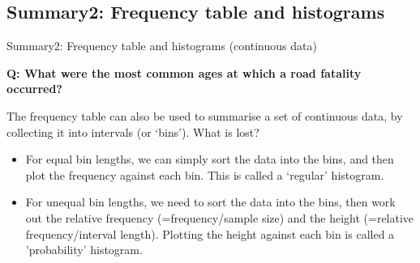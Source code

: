 \documentclass[t,xcolor=pdftex,dvipsnames,table]{beamer}
\makeatletter
\def\maxwidth{ %
  \ifdim\Gin@nat@width>\linewidth
    \linewidth
  \else
    \Gin@nat@width
  \fi
}
\newcommand{\hlcom}[1]{\textcolor[rgb]{0.678,0.584,0.686}{\textit{#1}}}%
\newcommand{\hlopt}[1]{\textcolor[rgb]{0,0,0}{#1}}%
\newcommand{\hlstd}[1]{\textcolor[rgb]{0.345,0.345,0.345}{#1}}%
\newcommand{\hlkwb}[1]{\textcolor[rgb]{0.69,0.353,0.396}{#1}}%
\newcommand{\hlkwd}[1]{\textcolor[rgb]{0.737,0.353,0.396}{\textbf{#1}}}%
\newenvironment{kframe}{%
 \def\at@end@of@kframe{}%
 \ifinner\ifhmode%
  \def\at@end@of@kframe{\end{minipage}}%
  \begin{minipage}{\columnwidth}%
 \fi\fi%
 \def\FrameCommand##1{\hskip\@totalleftmargin \hskip-\fboxsep
 \colorbox{shadecolor}{##1}\hskip-\fboxsep
     \hskip-\linewidth \hskip-\@totalleftmargin \hskip\columnwidth}%
 \MakeFramed {\advance\hsize-\width
   \@totalleftmargin\z@ \linewidth\hsize
   \@setminipage}}%
 {\par\unskip\endMakeFramed%
 \at@end@of@kframe}
\newenvironment{knitrout}{}{} %
\makeatother
\begin{document}

\subsection[]{Summary2: Frequency table and histograms}
\begin{frame}[fragile]{Summary2: Frequency table and histograms (continuous data)}

{\bf Q: What were the most common ages at which a road fatality occurred?}

\vspace{.5cm}
The frequency table can also be used to summarise a set of continuous data, by collecting it into intervals (or ‘bins’). What is lost?

\begin{itemize}
\item 
For equal bin lengths, we can simply sort the data into the bins, and then plot the frequency against each bin. This is called a `regular' histogram. 

\item
For unequal bin lengths, we need to sort the data into the bins, then work out the relative frequency (=frequency/sample size) and the height (=relative frequency/interval length). Plotting the height against each bin is called a 'probability' histogram.
\end{itemize}
\end{frame}
\end{document}
